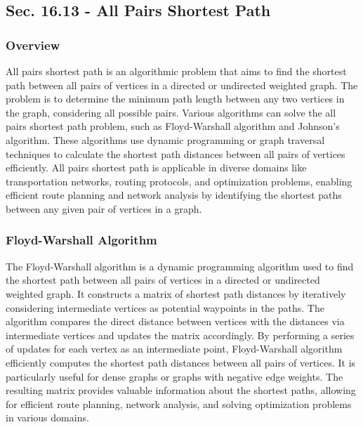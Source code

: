\subsection*{Sec. 16.13 - All Pairs Shortest Path}

\subsubsection{Overview}

All pairs shortest path is an algorithmic problem that aims to find the shortest path between all pairs of vertices in a directed or undirected weighted graph. The problem is to determine the minimum path length between any two 
vertices in the graph, considering all possible pairs. Various algorithms can solve the all pairs shortest path problem, such as Floyd-Warshall algorithm and Johnson's algorithm. These algorithms use dynamic programming or graph 
traversal techniques to calculate the shortest path distances between all pairs of vertices efficiently. All pairs shortest path is applicable in diverse domains like transportation networks, routing protocols, and optimization 
problems, enabling efficient route planning and network analysis by identifying the shortest paths between any given pair of vertices in a graph.

\subsubsection{Floyd-Warshall Algorithm}

The Floyd-Warshall algorithm is a dynamic programming algorithm used to find the shortest path between all pairs of vertices in a directed or undirected weighted graph. It constructs a matrix of shortest path distances by iteratively 
considering intermediate vertices as potential waypoints in the paths. The algorithm compares the direct distance between vertices with the distances via intermediate vertices and updates the matrix accordingly. By performing a series 
of updates for each vertex as an intermediate point, Floyd-Warshall algorithm efficiently computes the shortest path distances between all pairs of vertices. It is particularly useful for dense graphs or graphs with negative edge weights. 
The resulting matrix provides valuable information about the shortest paths, allowing for efficient route planning, network analysis, and solving optimization problems in various domains.

